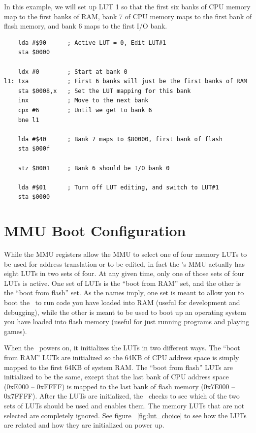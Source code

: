 In this example, we will set up LUT 1 so that the first six banks of CPU memory map to the first banks of RAM, bank 7 of CPU memory maps to the first bank of flash memory, and bank 6 maps to the first I/O bank.

\begin{verbatim}
    lda #$90      ; Active LUT = 0, Edit LUT#1
    sta $0000

    ldx #0        ; Start at bank 0
l1: txa           ; First 6 banks will just be the first banks of RAM
    sta $0008,x   ; Set the LUT mapping for this bank
    inx           ; Move to the next bank
    cpx #6        ; Until we get to bank 6
    bne l1

    lda #$40      ; Bank 7 maps to $80000, first bank of flash
    sta $000f

    stz $0001     ; Bank 6 should be I/O bank 0

    lda #$01      ; Turn off LUT editing, and switch to LUT#1
    sta $0000
\end{verbatim}

\section*{MMU Boot Configuration}

While the MMU registers allow the MMU to select one of four memory LUTs to be used for address translation or to be edited, in fact the \jr's MMU actually has eight LUTs in two sets of four. At any given time, only one of those sets of four LUTs is active. One set of LUTs is the ``boot from RAM'' set, and the other is the ``boot from flash'' set. As the names imply, one set is meant to allow you to boot the \jr\ to run code you have loaded into RAM (useful for development and debugging), while the other is meant to be used to boot up an operating system you have loaded into flash memory (useful for just running programs and playing games).

When the \jr\ powers on, it initializes the LUTs in two different ways. The ``boot from RAM'' LUTs are initialized so the 64KB of CPU address space is simply mapped to the first 64KB of system RAM. The ``boot from flash'' LUTs are initialized to be the same, except that the last bank of CPU address space (0xE000 -- 0xFFFF) is mapped to the last bank of flash memory (0x7E000 -- 0x7FFFF). After the LUTs are initialized, the \jr\ checks to see which of the two sets of LUTs should be used and enables them. The memory LUTs that are not selected are completely ignored. See figure ~\ref{fig:lut_choice} to see how the LUTs are related and how they are initialized on power up.

